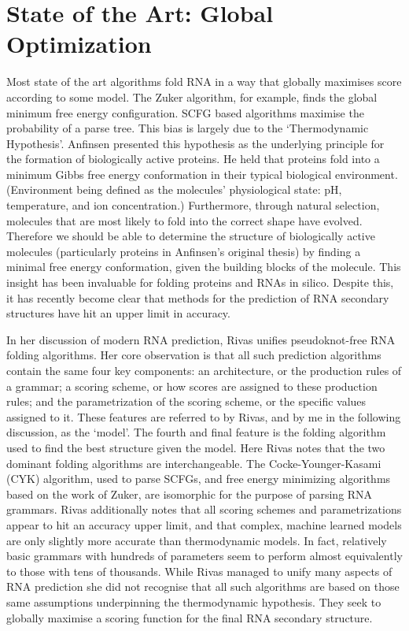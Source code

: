 \documentclass{cshonours}
\begin{document}
\section{State of the Art: Global Optimization}
\label{sec:softa}
Most state of the art algorithms fold RNA in a way that globally maximises score according to some model. The Zuker algorithm, for example, finds the global minimum free energy configuration. SCFG based algorithms maximise the probability of a parse tree. This bias is largely due to the `Thermodynamic Hypothesis'. Anfinsen \cite{anfinsen1973principles} presented this hypothesis as the underlying principle for the formation of biologically active proteins. He held that proteins fold into a minimum Gibbs free energy conformation in their typical biological environment. (Environment being defined as the molecules' physiological state: pH, temperature, and ion concentration.) Furthermore, through natural selection, molecules that are most likely to fold into the correct shape have evolved. Therefore we should be able to determine the structure of biologically active molecules (particularly proteins in Anfinsen's original thesis) by finding a minimal free energy conformation, given the building blocks of the molecule. This insight has been invaluable for folding proteins and RNAs in silico. Despite this, it has recently become clear that methods for the prediction of RNA secondary structures have hit an upper limit in accuracy.

In her discussion of modern RNA prediction, Rivas \cite{rivas2013four} unifies pseudoknot-free RNA folding algorithms. Her core observation is that all such prediction algorithms contain the same four key components: an architecture, or the production rules of a grammar; a scoring scheme, or how scores are assigned to these production rules; and the parametrization of the scoring scheme, or the specific values assigned to it. These features are referred to by Rivas, and by me in the following discussion, as the `model'. The fourth and final feature is the folding algorithm used to find the best structure given the model. Here Rivas notes that the two dominant folding algorithms are interchangeable. The Cocke-Younger-Kasami (CYK) algorithm, used to parse SCFGs, and free energy minimizing algorithms based on the work of Zuker, are isomorphic for the purpose of parsing RNA grammars. Rivas additionally notes that all scoring schemes and parametrizations appear to hit an accuracy upper limit, and that complex, machine learned models are only slightly more accurate than thermodynamic models. In fact, relatively basic grammars with hundreds of parameters seem to perform almost equivalently to those with tens of thousands. While Rivas managed to unify many aspects of RNA prediction she did not recognise that all such algorithms are based on those same assumptions underpinning the thermodynamic hypothesis. They seek to globally maximise a scoring function for the final RNA secondary structure. 
\end{document}
